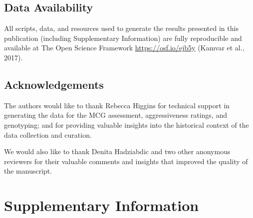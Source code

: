 \documentclass[fleqn,10pt,lineno]{wlpeerj} %
\theoremstyle{definition}
\theoremstyle{definition}
\theoremstyle{definition}
\theoremstyle{remark}
\begin{document}
\subsection*{Data Availability}\label{data-availability}

All scripts, data, and resources used to generate the results presented
in this publication (including Supplementary Information) are fully
reproducible and available at The Open Science Framework
\url{https://osf.io/ejb5y} (Kamvar et al., 2017).

\subsection*{Acknowledgements}\label{acknowledgements}

The authors would like to thank Rebecca Higgins for technical support in
generating the data for the MCG assessment, aggressiveness ratings, and
genotyping; and for providing valuable insights into the historical
context of the data collection and curation.

We would also like to thank Denita Hadziabdic and two other anonymous
reviewers for their valuable comments and insights that improved the
quality of the manuscript.

\newpage

\section*{Supplementary Information}\label{supplementary-information}

\setcounter{table}{0} \renewcommand{\thetable}{S\arabic{table}}
\setcounter{figure}{0} \renewcommand{\thefigure}{S\arabic{figure}}
\end{document}
